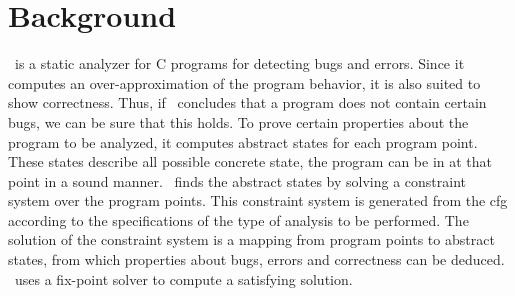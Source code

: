 \section{Background}
\label{sec:background}
\gob\ is a static analyzer for C programs for detecting bugs and errors. Since it computes an over-approximation of the program behavior, it is also suited to show correctness. Thus, if \gob\ concludes that a program does not contain certain bugs, we can be sure that this holds. To prove certain properties about the program to be analyzed, it computes abstract states for each program point. These states describe all possible concrete state, the program can be in at that point in a sound manner. \gob\ finds the abstract states by solving a constraint system over the program points. This constraint system is generated from the \ac{cfg} according to the specifications of the type of analysis to be performed. The solution of the constraint system is a mapping from program points to abstract states, from which properties about bugs, errors and correctness can be deduced. \gob\ uses a fix-point solver to compute a satisfying solution.

